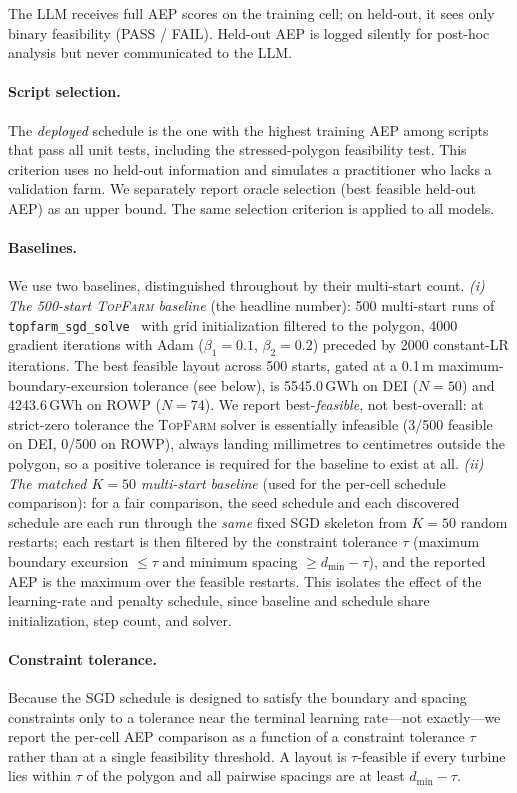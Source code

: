 The LLM receives full AEP scores on the training cell; on
held-out, it sees only binary feasibility (PASS / FAIL). Held-out
AEP is logged silently for post-hoc analysis but never
communicated to the LLM.

\paragraph{Script selection.}
The \emph{deployed} schedule is the one with the highest training
AEP among scripts that pass all unit tests, including the
stressed-polygon feasibility test. This criterion uses no held-out
information and simulates a practitioner who lacks a validation
farm. We separately report oracle selection (best feasible
held-out AEP) as an upper bound. The same selection criterion is
applied to all models.

\paragraph{Baselines.}
We use two baselines, distinguished throughout by their multi-start
count.
\emph{(i) The 500-start \textsc{TopFarm} baseline} (the headline
number): 500 multi-start runs of
\texttt{topfarm\_sgd\_solve}~\cite{pedersen2019topfarm} with grid
initialization filtered to the polygon, 4000 gradient iterations with
Adam ($\beta_1=0.1$, $\beta_2=0.2$) preceded by 2000 constant-LR
iterations. The best feasible layout across 500 starts, gated at a
0.1\,m maximum-boundary-excursion tolerance (see below), is
5545.0\,GWh on DEI ($N{=}50$) and 4243.6\,GWh on ROWP ($N{=}74$).
We report best-\emph{feasible}, not best-overall: at strict-zero
tolerance the \textsc{TopFarm} solver is essentially infeasible
(3/500 feasible on DEI, 0/500 on ROWP), always landing millimetres to
centimetres outside the polygon, so a positive tolerance is required
for the baseline to exist at all.
\emph{(ii) The matched $K{=}50$ multi-start baseline} (used for the
per-cell schedule comparison): for a fair comparison, the seed
schedule and each discovered schedule are each run through the
\emph{same} fixed SGD skeleton from $K{=}50$ random restarts; each
restart is then filtered by the constraint tolerance $\tau$ (maximum
boundary excursion $\le\tau$ and minimum spacing $\ge d_{\min}-\tau$),
and the reported AEP is the maximum over the feasible restarts. This
isolates the effect of the learning-rate and penalty schedule, since
baseline and schedule share initialization, step count, and solver.

\paragraph{Constraint tolerance.}
Because the SGD schedule is designed to satisfy the boundary and
spacing constraints only to a tolerance near the terminal learning
rate---not exactly---we report the per-cell AEP comparison as a
function of a constraint tolerance $\tau$ rather than at a single
feasibility threshold. A layout is $\tau$-feasible if every turbine
lies within $\tau$ of the polygon and all pairwise spacings are at
least $d_{\min}-\tau$.

